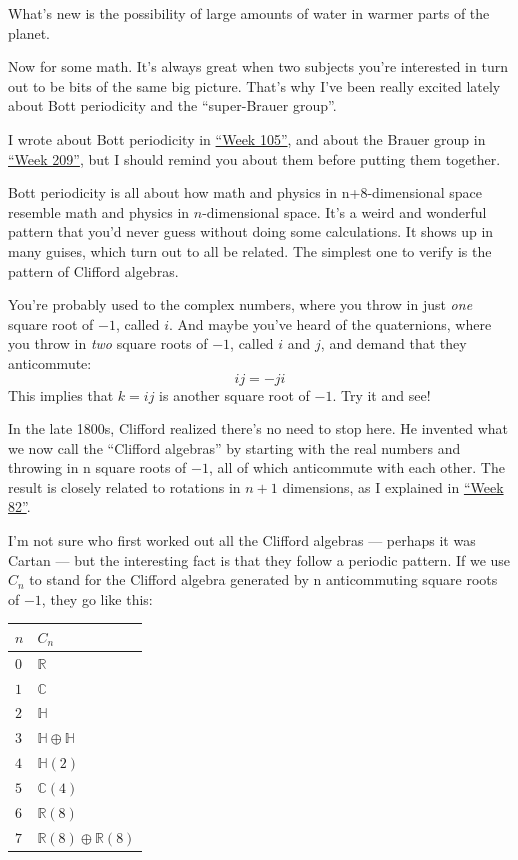 \documentclass{article}
\def\tightlist{}
\renewcommand{\texttt}[1]{%
  \begingroup
  \ttfamily
  \begingroup\lccode`~=`/\lowercase{\endgroup\def~}{/\discretionary{}{}{}}%
  \begingroup\lccode`~=`[\lowercase{\endgroup\def~}{[\discretionary{}{}{}}%
  \begingroup\lccode`~=`.\lowercase{\endgroup\def~}{.\discretionary{}{}{}}%
  \catcode`/=\active\catcode`[=\active\catcode`.=\active
  \scantokens{#1\noexpand}%
  \endgroup
}
\begin{document}

What's new is the possibility of large amounts of water in warmer parts
of the planet.

Now for some math. It's always great when two subjects you're interested
in turn out to be bits of the same big picture. That's why I've been
really excited lately about Bott periodicity and the ``super-Brauer
group''.

I wrote about Bott periodicity in \protect\hyperlink{week105}{``Week
105''}, and about the Brauer group in \protect\hyperlink{week209}{``Week
209''}, but I should remind you about them before putting them together.

Bott periodicity is all about how math and physics in n+8-dimensional
space resemble math and physics in \(n\)-dimensional space. It's a weird
and wonderful pattern that you'd never guess without doing some
calculations. It shows up in many guises, which turn out to all be
related. The simplest one to verify is the pattern of Clifford algebras.

You're probably used to the complex numbers, where you throw in just
\emph{one} square root of \(-1\), called \(i\). And maybe you've heard
of the quaternions, where you throw in \emph{two} square roots of
\(-1\), called \(i\) and \(j\), and demand that they anticommute:
\[ij = -ji\] This implies that \(k = ij\) is another square root of
\(-1\). Try it and see!

In the late 1800s, Clifford realized there's no need to stop here. He
invented what we now call the ``Clifford algebras'' by starting with the
real numbers and throwing in n square roots of \(-1\), all of which
anticommute with each other. The result is closely related to rotations
in \(n+1\) dimensions, as I explained in
\protect\hyperlink{week82}{``Week 82''}.

I'm not sure who first worked out all the Clifford algebras --- perhaps
it was Cartan --- but the interesting fact is that they follow a
periodic pattern. If we use \(C_n\) to stand for the Clifford algebra
generated by n anticommuting square roots of \(-1\), they go like this:

\begin{longtable}[]{@{}ll@{}}
\toprule
\(n\) & \(C_n\)\tabularnewline
\midrule
\endhead
\(0\) & \(\mathbb{R}\)\tabularnewline
\(1\) & \(\mathbb{C}\)\tabularnewline
\(2\) & \(\mathbb{H}\)\tabularnewline
\(3\) & \(\mathbb{H}\oplus\mathbb{H}\)\tabularnewline
\(4\) & \(\mathbb{H}(2)\)\tabularnewline
\(5\) & \(\mathbb{C}(4)\)\tabularnewline
\(6\) & \(\mathbb{R}(8)\)\tabularnewline
\(7\) & \(\mathbb{R}(8)\oplus\mathbb{R}(8)\)\tabularnewline
\bottomrule
\end{longtable}
\end{document}
